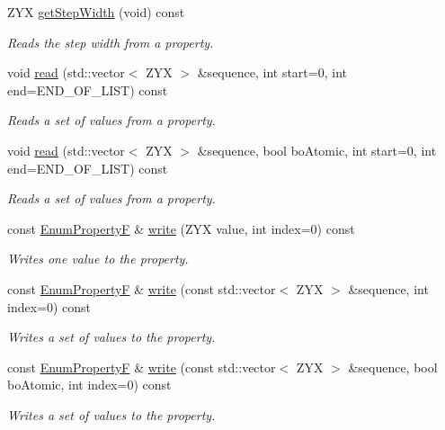 \begin{DoxyCompactItemize}
Z\+Y\+X \hyperlink{classmv_i_m_p_a_c_t_1_1acquire_1_1_enum_property_f_a82b3546a62ad7fa1ef8d3f6ac001088d}{get\+Step\+Width} (void) const 
\begin{DoxyCompactList}\small\item\em Reads the step width from a property. \end{DoxyCompactList}\item 
void \hyperlink{classmv_i_m_p_a_c_t_1_1acquire_1_1_enum_property_f_a1e2fc6fb7673146319627a43480f3e53}{read} (std\+::vector$<$ Z\+Y\+X $>$ \&sequence, int start=0, int end=E\+N\+D\+\_\+\+O\+F\+\_\+\+L\+I\+S\+T) const 
\begin{DoxyCompactList}\small\item\em Reads a set of values from a property. \end{DoxyCompactList}\item 
void \hyperlink{classmv_i_m_p_a_c_t_1_1acquire_1_1_enum_property_f_a2368faf0805858d3c9fc5ce4cf11413c}{read} (std\+::vector$<$ Z\+Y\+X $>$ \&sequence, bool bo\+Atomic, int start=0, int end=E\+N\+D\+\_\+\+O\+F\+\_\+\+L\+I\+S\+T) const 
\begin{DoxyCompactList}\small\item\em Reads a set of values from a property. \end{DoxyCompactList}\item 
const \hyperlink{classmv_i_m_p_a_c_t_1_1acquire_1_1_enum_property_f}{Enum\+Property\+F} \& \hyperlink{classmv_i_m_p_a_c_t_1_1acquire_1_1_enum_property_f_aab43f168b6787d73837e2f9a65d983c4}{write} (Z\+Y\+X value, int index=0) const 
\begin{DoxyCompactList}\small\item\em Writes one value to the property. \end{DoxyCompactList}\item 
const \hyperlink{classmv_i_m_p_a_c_t_1_1acquire_1_1_enum_property_f}{Enum\+Property\+F} \& \hyperlink{classmv_i_m_p_a_c_t_1_1acquire_1_1_enum_property_f_ab0d742ff250d4dbf09809b2da4f6be90}{write} (const std\+::vector$<$ Z\+Y\+X $>$ \&sequence, int index=0) const 
\begin{DoxyCompactList}\small\item\em Writes a set of values to the property. \end{DoxyCompactList}\item 
const \hyperlink{classmv_i_m_p_a_c_t_1_1acquire_1_1_enum_property_f}{Enum\+Property\+F} \& \hyperlink{classmv_i_m_p_a_c_t_1_1acquire_1_1_enum_property_f_a6a54ab88ead46d5e8026b05907b90498}{write} (const std\+::vector$<$ Z\+Y\+X $>$ \&sequence, bool bo\+Atomic, int index=0) const 
\begin{DoxyCompactList}\small\item\em Writes a set of values to the property. \end{DoxyCompactList}\end{DoxyCompactItemize}

